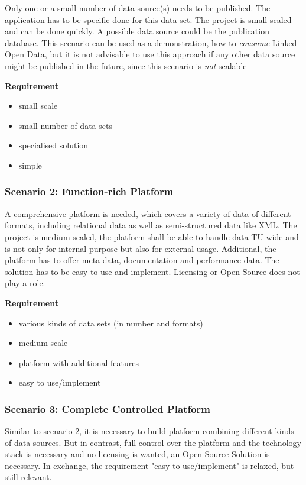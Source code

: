 Only one or a small number of data source(s) needs to be published. The application has to be specific done for this data set. The project is small scaled and can be done quickly. A possible data source could be the publication database. This scenario can be used as a demonstration, how to \emph{consume} Linked Open Data, but it is not advisable to use this approach if any other data source might be published in the future, since this scenario is \emph{not} scalable

\textbf{Requirement}
\begin{itemize}
\itemsep0pt
\item small scale
\item small number of data sets
\item specialised solution
\item simple
\end{itemize}

\subsubsection{Scenario 2: Function-rich Platform}

A comprehensive platform is needed, which covers a variety of data of different formats, including relational data as well as semi-structured data like XML. The project is medium scaled, the platform shall be able to handle data TU wide and is not only for internal purpose but also for external usage. Additional, the platform has to offer meta data, documentation and performance data. The solution has to be easy to use and implement. Licensing or Open Source does not play a role. 

\textbf{Requirement}
\begin{itemize}
\itemsep0pt
\item various kinds of data sets (in number and formats)
\item medium scale
\item platform with additional features
\item easy to use/implement
\end{itemize}

\subsubsection{Scenario 3: Complete Controlled Platform}

Similar to scenario 2, it is necessary to build platform combining different kinds of data sources. But in contrast, full control over the platform and the technology stack is necessary and no licensing is wanted, an Open Source Solution is necessary. In exchange, the requirement "easy to use/implement" is relaxed, but still relevant.

